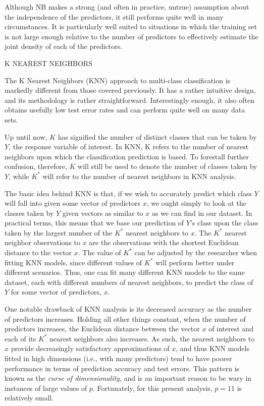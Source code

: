 \documentclass[12pt]{article}
\begin{document}
Although NB makes a strong (and often in practice, untrue) assumption about the independence 
of the predictors, it still performs quite well in many circumstances.  It is particularly 
well suited to situations in which the training set is not large enough relative to the 
number of predictors to effectively estimate the joint density of each of the predictors.  

K NEAREST NEIGHBORS

The K Nearest Neighbors (KNN) approach to multi-class classification is markedly different 
from those covered previously.  It has a rather intuitive design, and its methodology is 
rather straightforward.  Interestingly enough, it also often obtains usefully low test 
error rates and can perform quite well on many data sets.  

Up until now, $K$ has signified the number of distinct classes that can be taken by $Y$, 
the response variable of interest.  In KNN, K refers to the number of nearest neighbors 
upon which the classification prediction is based.  To forestall further confusion, 
therefore, $K$ will still be used to denote the number of classes taken by $Y$, while 
$K ^ *$ will refer to the number of nearest neighbors in KNN analysis.  

The basic idea behind KNN is that, if we wish to accurately predict which class $Y$ will 
fall into given some vector of predictors $x$, we ought simply to look at the classes 
taken by $Y$ given vectors as similar to $x$ as we can find in our dataset.  In practical 
terms, this means that we base our prediction of $Y$'s class upon the class taken by the 
largest number of the $K ^ *$ nearest neighbors to $x$.  The $K ^ *$ nearest neighbor 
observations to $x$ are the observations with the shortest Euclidean distance to the 
vector $x$.  The value of $K ^ *$ can be adjusted by the researcher when fitting KNN 
models, since different values of $K ^ *$ will perform better under different scenarios.  
Thus, one can fit many different KNN models to the same dataset, each with different 
numbers of nearest neighbors, to predict the class of $Y$ for some vector of predictors, 
$x$.  

One notable drawback of KNN analysis is its decreased accuracy as the number of 
predictors increases.  Holding all other things constant, when the number of predictors 
increases, the Euclidean distance between the vector $x$ of interest and each of its 
$K ^ *$ nearest neighbors also increases.  As such, the nearest neighbors to $x$ provide 
decreasingly satisfactory approximations of $x$, and thus KNN models fitted in high 
dimensions (i.e., with many predictors) tend to have poorer performance in terms of 
prediction accuracy and test errors.  This pattern is known as the 
\textit{curse of dimensionality}, and is an important reason to be wary in instances of 
large values of $p$.  Fortunately, for this present analysis, $p = 11$ is relatively 
small. 
\end{document}
